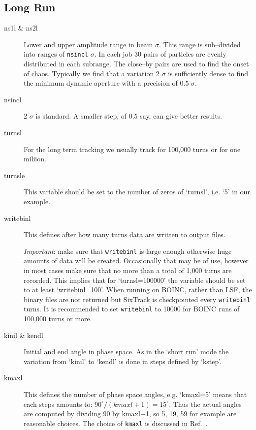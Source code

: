 \documentclass{cernatsnote}    %
\begin{document}
\subsection{Long Run}
\label{sec:run_six:longrun}
\begin{description}
\item [ns1l \& ns2l]
  Lower and upper amplitude range in beam $\sigma$. This range is
  sub--divided into ranges of {\tt nsincl} $\sigma$. In each job 30 pairs of
  particles are evenly distributed in each subrange. The
  close--by pairs are used to find the onset of chaos. Typically we
  find that a variation 2 $\sigma$ is sufficiently dense to find the
  minimum dynamic aperture with a precision of 0.5 $\sigma$.
\item [nsincl] 2 $\sigma$ is standard. A smaller step, of 0.5 say, 
can give better results.
\item [turnsl]
  For the long term tracking we usually track for 100,000 turns or for
one miliion.
\item [turnsle]
  This variable should be set to the number of zeros of `turnsl',
  i.e. `5' in our example. 
\item [writebinl]
  This defines after how many turns data are written to output
  files.

  \emph{Important}: make sure that {\tt writebinl} is large enough
  otherwise huge amounts of data will be created. Occasionally that
  may be of use, however in most cases make sure that no more than a
  total of 1,000 turns are recorded. This implies that for
  `turnsl=100000' the variable should be set to at least `writebinl=100'.
  When running on BOINC, rather than LSF, the binary files are not returned
  but SixTrack is checkpointed every {\tt writebinl} turns. 
  It is recommended to set {\tt writebinl} to 10000 for BOINC runs 
of 100,000 turns or more.
\item[kinil \& kendl]
  Initial and end angle in phase space. As in the `short run' mode
  the variation from `kinil' to `kendl' is done in steps defined by
  `kstep'. 
\item [kmaxl]
  This defines the number of phase space angles, e.g. `kmaxl=5'
  means that each steps amounts to: $90^\circ/(kmaxl+1)=15^\circ$.
  Thus the actual angles are computed by dividing 90
  by kmaxl+1, so 5, 19, 59 for example are reasonable choices.
  The choice of {\tt kmaxl} is discussed in Ref.~\cite{fandmpaper}.
\end{description}
\end{document}
